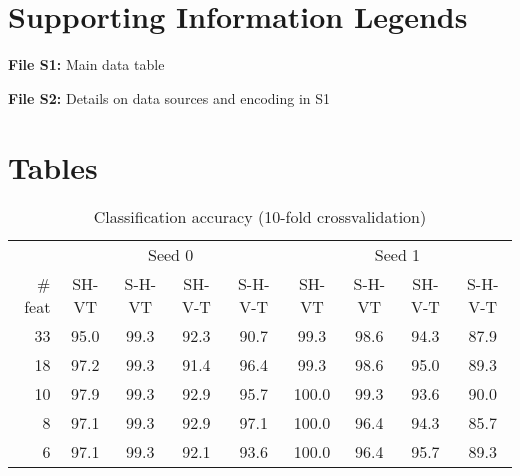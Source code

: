 \documentclass[10pt]{article}
\begin{document}
\section*{Supporting Information Legends}

\smallskip\noindent
{\bf File S1:} Main data table

\smallskip\noindent
{\bf File S2:} Details on data sources and encoding in S1

\section*{Tables}

\begin{table}[h!]
\caption{Classification accuracy (10-fold crossvalidation)}
\begin{center}
\begin{tabular}{r|cccc||cccc|}
& \multicolumn{4}{c}{Seed 0} & \multicolumn{4}{c}{Seed 1}\\
\# feat & SH-VT & S-H-VT & SH-V-T & S-H-V-T &  SH-VT & S-H-VT & SH-V-T & S-H-V-T \\\hline
33	&	95.0	&	99.3	&	92.3	&	90.7	&	99.3	&	98.6	&	94.3	&	87.9\\
18	&	97.2	&	99.3	&	91.4	&	96.4	&	99.3	&	98.6	&	95.0	&	89.3\\
10	&	97.9	&	99.3	&	92.9	&	95.7	&	100.0	&	99.3	&	93.6	&	90.0\\
8	&	97.1	&	99.3	&	92.9	&	97.1	&	100.0	&	96.4	&	94.3	&	85.7\\
6	&	97.1	&	99.3	&	92.1	&	93.6	&	100.0	&	96.4	&	95.7	&	89.3\\
\end{tabular}
\end{center}
\label{tab1}
\end{table}
\end{document}
